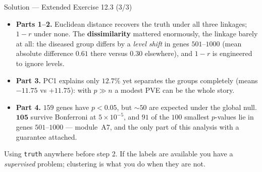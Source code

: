 \documentclass[aspectratio=169,11pt]{beamer}
\begin{document}
\begin{frame}{Solution --- Extended Exercise 12.3 (3/3)}
  \footnotesize
\begin{solutionbox}
  \begin{itemize}
    \item \textbf{Parts 1--2.} Euclidean distance recovers the truth under all three
          linkages; $1-r$ under none. The \textbf{dissimilarity} mattered enormously, the
          linkage barely at all: the diseased group differs by a \emph{level shift} in genes
          $501$--$1000$ (mean absolute difference $0.61$ there versus $0.30$ elsewhere), and
          $1-r$ is engineered to ignore levels.
    \item \textbf{Part 3.} PC1 explains only $12.7\%$ yet separates the groups completely
          (means $-11.75$ vs $+11.75$): with $p\gg n$ a modest PVE can be the whole story.
    \item \textbf{Part 4.} $159$ genes have $p<0.05$, but $\sim 50$ are expected under the
          global null. $\mathbf{105}$ survive Bonferroni at $5\times10^{-5}$, and $91$ of
          the $100$ smallest $p$-values lie in genes $501$--$1000$ --- module~A7, and the
          only part of this analysis with a guarantee attached.
  \end{itemize}
\end{solutionbox}
\begin{mistake}
  Using \texttt{truth} anywhere before step 2. If the labels are available you have a
  \emph{supervised} problem; clustering is what you do when they are not.
\end{mistake}
\end{frame}
\end{document}
